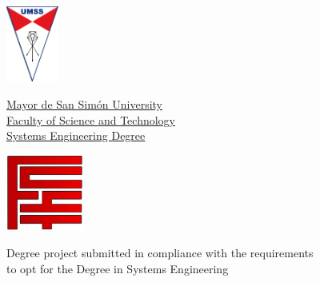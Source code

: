 \documentclass[11pt,spanish,singlespacing,headsepline]{MastersDoctoralThesis}
\author{Evelyn \textsc{Cusi López}}
\begin{document}

\frontmatter %

\pagestyle{plain} %
\begin{titlepage}

\begin{minipage}[l]{.15\linewidth}
\includegraphics[height=2.5cm]{imagenes/umss}
\end{minipage}
\begin{minipage}[c]{.65\textwidth}
\begin{center}
\href{http://www.umss.edu.bo}{\LARGE{Mayor de San Sim\'{o}n University}} \\
\href{http://www.fcyt.umss.edu.bo}{\LARGE{Faculty of Science and Technology}} \\
\href{http://www.cs.umss.edu.bo}{\LARGE{Systems Engineering Degree}}
\end{center}
\end{minipage}
\begin{minipage}[r]{.15\linewidth}
\includegraphics[height=2.5cm]{imagenes/logo}
\end{minipage}

\vfill
\begin{center}
\Huge {\bf{\ttitle}}	
\end{center}
\singlespacing
\singlespacing
\singlespacing
\singlespacing
\singlespacing
\singlespacing
\begin{center}
{\large Degree project submitted in compliance with the requirements\\ to opt for the Degree in Systems Engineering}
\end{center}
\vspace{\fill}


\end{titlepage}
\end{document}

